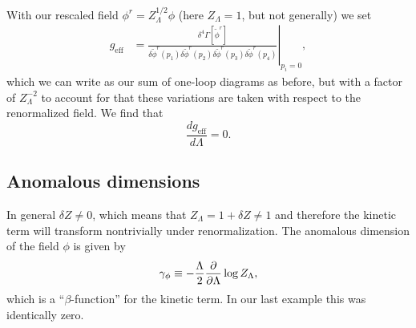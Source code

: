 With our rescaled field $\phi^r =Z_\Lambda^{1/2} \phi$ (here $Z_\Lambda=1$, but not generally) we set
\begin{align*}
    g_\text{eff} &= \left.\frac{\delta^{4}\Gamma[\tilde \phi^r]}{\delta \tilde \phi^r (p_1) \delta \tilde \phi^r (p_2) \delta \tilde \phi^r (p_3) \delta \tilde \phi^r(p_4)}\right|_{p_i=0},
\end{align*}
which we can write as our sum of one-loop diagrams as before, but with a factor of $Z_\Lambda^{-2}$ to account for that these variations are taken with respect to the renormalized field. We find that
\begin{equation}
    \frac{dg_\text{eff}}{d\Lambda}=0.
\end{equation}

\subsection*{Anomalous dimensions}
In general $\delta Z \neq 0$, which means that $Z_\Lambda =1 +\delta Z \neq 1$ and therefore the kinetic term will transform nontrivially under renormalization. The anomalous dimension of the field $\phi$ is given by
\begin{equation}
    \gamma_\phi \equiv -\frac{\Lambda}{2} \P{}{\Lambda} \log Z_\Lambda,
\end{equation}
which is a ``$\beta$-function'' for the kinetic term. In our last example this was identically zero.

